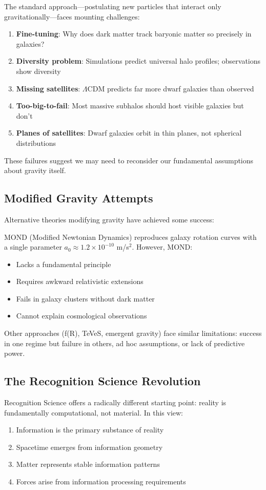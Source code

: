 \documentclass[12pt,letterpaper]{article}
\newcommand{\lcdm}{\Lambda\text{CDM}}
\begin{document}
The standard approach---postulating new particles that interact only gravitationally---faces mounting challenges:
\begin{enumerate}
\item \textbf{Fine-tuning}: Why does dark matter track baryonic matter so precisely in galaxies?
\item \textbf{Diversity problem}: Simulations predict universal halo profiles; observations show diversity
\item \textbf{Missing satellites}: $\lcdm$ predicts far more dwarf galaxies than observed
\item \textbf{Too-big-to-fail}: Most massive subhalos should host visible galaxies but don't
\item \textbf{Planes of satellites}: Dwarf galaxies orbit in thin planes, not spherical distributions
\end{enumerate}

These failures suggest we may need to reconsider our fundamental assumptions about gravity itself.

\subsection{Modified Gravity Attempts}

Alternative theories modifying gravity have achieved some success:

MOND (Modified Newtonian Dynamics) reproduces galaxy rotation curves with a single parameter $a_0 \approx 1.2 \times 10^{-10}$ m/s$^2$. However, MOND:
\begin{itemize}
\item Lacks a fundamental principle
\item Requires awkward relativistic extensions
\item Fails in galaxy clusters without dark matter
\item Cannot explain cosmological observations
\end{itemize}

Other approaches (f(R), TeVeS, emergent gravity) face similar limitations: success in one regime but failure in others, ad hoc assumptions, or lack of predictive power.

\subsection{The Recognition Science Revolution}

Recognition Science offers a radically different starting point: reality is fundamentally computational, not material. In this view:
\begin{enumerate}
\item Information is the primary substance of reality
\item Spacetime emerges from information geometry
\item Matter represents stable information patterns
\item Forces arise from information processing requirements
\end{enumerate}
\end{document}
